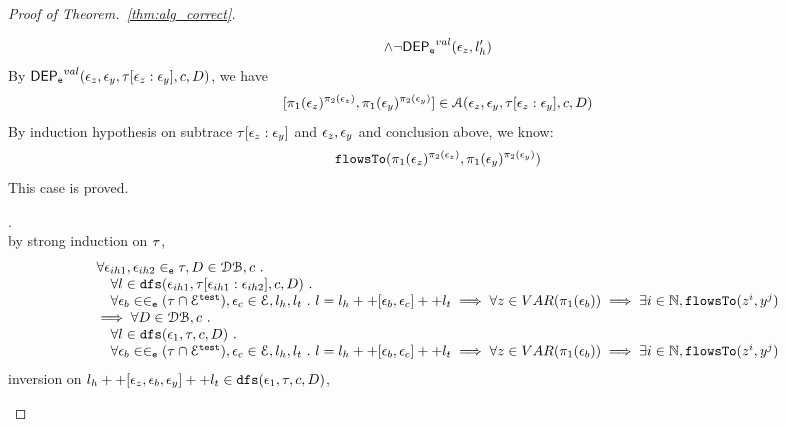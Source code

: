 \begin{proof}[Proof of Theorem.~\ref{thm:alg_correct}]
\begin{case}
\begin{subcase}
\[  \land 
  \neg \mathsf{DEP_{\mathtt{e}}}^{val} (\mathtt{\epsilon}_z, l_h')
\]
%
By $\mathsf{DEP_{\mathtt{e}}}^{val}(\mathtt{\epsilon}_z, \mathtt{\epsilon}_y, \mathtt{\tau}[\mathtt{\epsilon}_z: \mathtt{\epsilon}_y], c, D)$, 
we have
\[
  [\pi_1(\mathtt{\epsilon}_z)^{\pi_2(\mathtt{\epsilon}_z)}, \pi_1(\mathtt{\epsilon}_y)^{\pi_2(\mathtt{\epsilon}_y)}] 
  \in \mathcal{A}(\mathtt{\epsilon}_z, \mathtt{\epsilon}_y, \mathtt{\tau}[\mathtt{\epsilon}_{z}:\mathtt{\epsilon}_{y}], c, D) 
\]
%
By induction hypothesis on subtrace $\mathtt{\tau}[\mathtt{\epsilon}_z: \mathtt{\epsilon}_y]$ and $\mathtt{\epsilon}_z, \mathtt{\epsilon}_y$ and conclusion above, we know:
\[
  \mathtt{flowsTo}(\pi_1(\mathtt{\epsilon}_z)^{\pi_2(\mathtt{\epsilon}_z)}, \pi_1(\mathtt{\epsilon}_y)^{\pi_2(\mathtt{\epsilon}_y)})
\]
This case is proved.
%
%
\end{subcase}
%
\begin{subcase}.
\\
by strong induction on $\mathtt{\tau}$,
\[
\begin{array}{l}
  \forall \mathtt{\epsilon}_{ih1}, \mathtt{\epsilon}_{ih2} \in_{\mathtt{e}} \mathtt{\tau}, D \in \mathcal{DB} , c ~.~
  \\ \quad 
   \forall l \in \mathtt{dfs}(\mathtt{\epsilon}_{ih1}, \mathtt{\tau}[\mathtt{\epsilon}_{ih1}:\mathtt{\epsilon}_{ih2}], c, D) ~.~
   \\ \quad 
   \forall \mathtt{\epsilon}_b \in \in_{\mathtt{e}} (\mathtt{\tau} \cap \mathcal{E}^{\mathtt{{test}}}), \mathtt{\epsilon}_c \in \mathcal{E}, l_h, l_t ~.~ 
   l = l_h ++ [ \mathtt{\epsilon}_b, \mathtt{\epsilon}_c] ++ l_t 
   \implies \forall z \in VAR(\pi_1(\mathtt{\epsilon}_b)) \implies \exists i \in \mathbb{N}, \mathtt{flowsTo}(z^i, y^j)
   \\
   \implies
   \forall D \in \mathcal{DB} , c ~.~
  \\ \quad 
   \forall l \in \mathtt{dfs}(\mathtt{\epsilon}_1, \mathtt{\tau}, c, D) ~.~
   \\ \quad 
   \forall \mathtt{\epsilon}_b \in \in_{\mathtt{e}} (\mathtt{\tau} \cap \mathcal{E}^{\mathtt{{test}}}), \mathtt{\epsilon}_c \in \mathcal{E}, l_h, l_t ~.~ 
   l = l_h ++ [ \mathtt{\epsilon}_b, \mathtt{\epsilon}_c] ++ l_t 
   \implies \forall z \in VAR(\pi_1(\mathtt{\epsilon}_b)) \implies \exists i \in \mathbb{N}, \mathtt{flowsTo}(z^i, y^j)
\end{array}
\]
inversion on  $l_h ++ {[\mathtt{\epsilon}_z,  \mathtt{\epsilon}_b, \mathtt{\epsilon}_y]} ++ l_t \in \mathtt{dfs}(\mathtt{\epsilon}_1, \mathtt{\tau}, c, D)$, 

\end{subcase}
\end{case}
\end{proof}
